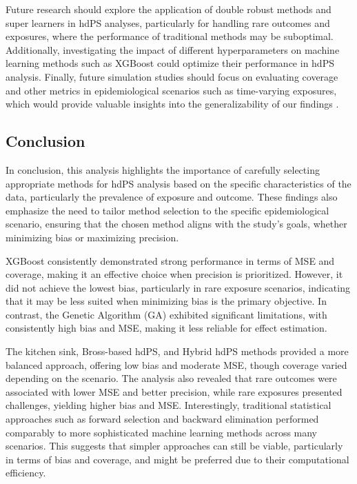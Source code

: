 \documentclass[sn-vancouver,Numbered,lineno,pdflatex]{sn-jnl}
\begin{document}
Future research should explore the application of double robust methods
and super learners in hdPS analyses, particularly for handling rare
outcomes and exposures, where the performance of traditional methods may
be suboptimal. Additionally, investigating the impact of different
hyperparameters on machine learning methods such as XGBoost could
optimize their performance in hdPS analysis. Finally, future simulation
studies should focus on evaluating coverage and other metrics in
epidemiological scenarios such as time-varying exposures, which would
provide valuable insights into the generalizability of our findings
\citep{neugebauer2015high}.

\subsection{Conclusion}\label{conclusion}

In conclusion, this analysis highlights the importance of carefully
selecting appropriate methods for hdPS analysis based on the specific
characteristics of the data, particularly the prevalence of exposure and
outcome. These findings also emphasize the need to tailor method
selection to the specific epidemiological scenario, ensuring that the
chosen method aligns with the study's goals, whether minimizing bias or
maximizing precision.

XGBoost consistently demonstrated strong performance in terms of MSE and
coverage, making it an effective choice when precision is prioritized.
However, it did not achieve the lowest bias, particularly in rare
exposure scenarios, indicating that it may be less suited when
minimizing bias is the primary objective. In contrast, the Genetic
Algorithm (GA) exhibited significant limitations, with consistently high
bias and MSE, making it less reliable for effect estimation.

The kitchen sink, Bross-based hdPS, and Hybrid hdPS methods provided a
more balanced approach, offering low bias and moderate MSE, though
coverage varied depending on the scenario. The analysis also revealed
that rare outcomes were associated with lower MSE and better precision,
while rare exposures presented challenges, yielding higher bias and MSE.
Interestingly, traditional statistical approaches such as forward
selection and backward elimination performed comparably to more
sophisticated machine learning methods across many scenarios. This
suggests that simpler approaches can still be viable, particularly in
terms of bias and coverage, and might be preferred due to their
computational efficiency.
\end{document}
